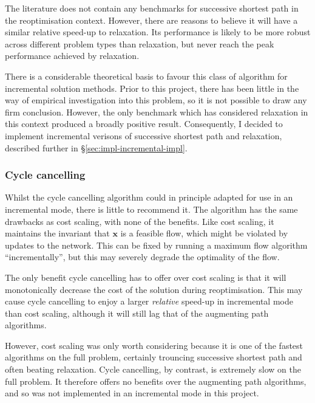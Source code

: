The literature does not contain any benchmarks for successive shortest path in the reoptimisation context. However, there are reasons to believe it will have a similar relative speed-up to relaxation. Its performance is likely to be more robust across different problem types than relaxation, but never reach the peak performance achieved by relaxation.

There is a considerable theoretical basis to favour this class of algorithm for incremental solution methods. Prior to this project, there has been little in the way of empirical investigation into this problem, so it is not possible to draw any firm conclusion. However, the only benchmark which has considered relaxation in this context produced a broadly positive result. Consequently, I decided to implement incremental verisons of successive shortest path and relaxation, described further in \S\ref{sec:impl-incremental-impl}.

\subsubsection{Cycle cancelling}

Whilst the cycle cancelling algorithm could in principle adapted for use in an incremental mode, there is little to recommend it. The algorithm has the same drawbacks as cost scaling, with none of the benefits. Like cost scaling, it maintains the invariant that $\mathbf{x}$ is a feasible flow, which might be violated by updates to the network. This can be fixed by running a maximum flow algorithm ``incrementally'', but this may severely degrade the optimality of the flow. 

The only benefit cycle cancelling has to offer over cost scaling is that it will monotonically decrease the cost of the solution during reoptimisation\footnotemark. This may cause cycle cancelling to enjoy a larger \emph{relative} speed-up in incremental mode than cost scaling, although it will still lag that of the augmenting path algorithms.

However, cost scaling was only worth considering because it is one of the fastest algorithms on the full problem, certainly trouncing successive shortest path and often beating relaxation. Cycle cancelling, by contrast, is extremely slow on the full problem. It therefore offers no benefits over the augmenting path algorithms, and so was not implemented in an incremental mode in this project.

